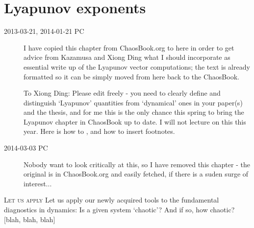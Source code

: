         \ifdasbuch
        \else
        \fi

        \ifdasbuch
{}
        \else
\chapter{Lyapunov exponents}
\label{c-Lyapunov}
        \fi


        \ifdasbuch
        \else
\begin{description}

\item[2013-03-21, 2014-01-21 PC]
I have copied this chapter from ChaosBook.org to here in order to get advice
from Kazamusa and Xiong Ding what I should incorporate as essential write up
of the Lyapunov vector computations; the text is already formatted so it
can be simply moved from here back to the ChaosBook.

To Xiong Ding: Please edit freely - you need to clearly define and
distinguish `Lyapunov' quantities from `dynamical' ones in your paper(s)
and the thesis, and for me this is the only chance this spring to bring
the Lyapunov chapter in ChaosBook up to date. I will not lecture on this
this year. Here is how to , and how to insert
footnotes.

\item[2014-03-03 PC] Nobody want to look critically at this, so I have
removed this chapter - the original is in  ChaosBook.org and easily fetched,
if there is a suden surge of interest...

\end{description}
        \fi


\noindent
        \ifdasbuch
\lettrine[lines=3,lraise=0.1,lhang=0.2]{L}{et us apply}
        \else
Let us apply
        \fi
our newly acquired tools to the fundamental diagnostics in
dynamics: Is a given system `chaotic'? And if so, how chaotic?
[blah, blah, blah]

%
%  
%  

\ChapterEnd

